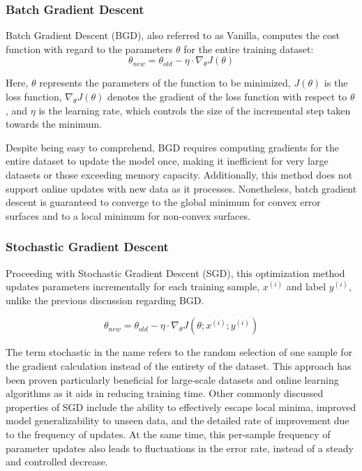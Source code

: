 \subsubsection{Batch Gradient Descent}
Batch Gradient Descent (BGD), also referred to as Vanilla, computes the cost function with regard to the parameters $\theta$ for the
entire training dataset:
\begin{equation}
    \label{eq:bgd}
    \theta_{new} = \theta_{old} - \eta \cdot \nabla_{\theta} J(\theta)
\end{equation}

\noindent
Here, $\theta$ represents the parameters of the function to be minimized, $J(\theta)$ is the loss function, $\nabla_{\theta} J(\theta)$
denotes the gradient of the loss function with respect to $\theta$, and $\eta$ is the learning rate, which controls the size of the incremental
step taken towards the minimum.

Despite being easy to comprehend, BGD requires computing gradients for the entire dataset to update the model once, making it inefficient
for very large datasets or those exceeding memory capacity\cite{ruderOverviewGradientDescent2017}. Additionally, this method does not
support online updates with new data as it processes. Nonetheless, batch gradient descent is guaranteed to converge to the global minimum
for convex error surfaces and to a local minimum for non-convex surfaces.

\subsubsection{Stochastic Gradient Descent}
Proceeding with Stochastic Gradient Descent (SGD), this optimization method updates parameters incrementally for each training sample, $x^{(i)}$
and label $y^{(i)}$, unlike the previous discussion regarding BGD\@.

\begin{equation}
    \label{eq:sgd}
    \theta_{new} = \theta_{old} - \eta \cdot \nabla_{\theta} J(\theta; x^{(i)}; y^{(i)})
\end{equation}

The term stochastic in the name refers to the random selection of one sample for the gradient calculation instead of the entirety
of the dataset. This approach has been proven particularly beneficial for large-scale datasets and online learning algorithms as
it aids in reducing training time. Other commonly discussed properties of SGD include the ability to effectively escape local minima,
improved model generalizability to unseen data, and the detailed rate of improvement due to the frequency of updates. At the same time,
this per-sample frequency of parameter updates also leads to fluctuations in the error rate, instead of a steady and controlled decrease.

